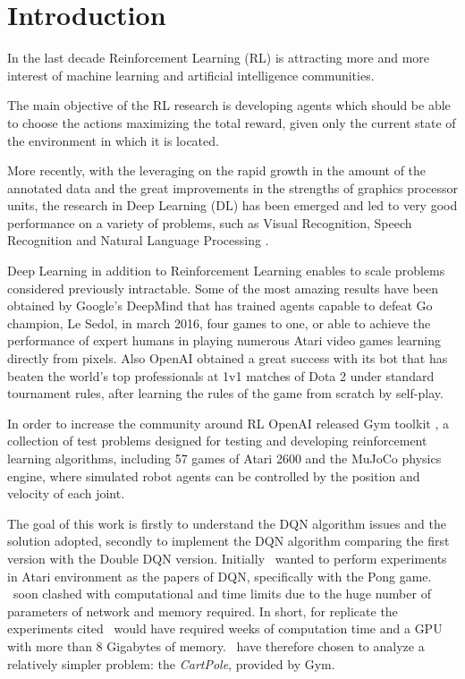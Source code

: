 \section{Introduction}

In the last decade Reinforcement Learning (RL) is attracting more and more interest of machine learning and artificial intelligence communities.

The main objective of the RL research is developing agents which should be able to choose the actions maximizing the total reward, given only the current state of the environment in which it is located.

More recently, with the leveraging on the rapid growth in the amount of the annotated data and the great improvements in the strengths of graphics processor units, the research in Deep Learning (DL) has been emerged and led to very good performance on a variety of problems, such as Visual Recognition, Speech Recognition and Natural Language Processing \cite{AdvancesCNN}.

Deep Learning in addition to Reinforcement Learning enables to scale problems considered previously intractable. Some of the most amazing results have been obtained by Google’s DeepMind that has trained agents capable to defeat Go champion, Le Sedol, in march 2016, four games to one, or able to achieve the performance of expert humans in playing numerous Atari video games learning directly from pixels. Also OpenAI obtained a great success with its bot that has beaten the world's top professionals at 1v1 matches of Dota 2 under standard tournament rules, after learning the rules of the game from scratch by self-play.

In order to increase the community around RL OpenAI released Gym toolkit \cite{Gym}, a collection of test problems designed for testing and developing reinforcement learning algorithms, including 57 games of Atari 2600 and the MuJoCo physics engine, where simulated robot agents can be controlled by the position and velocity of each joint. 

The goal of this work is firstly to understand the DQN algorithm issues and the solution adopted, secondly to implement the DQN algorithm comparing the first version with the Double DQN version. Initially \auth~wanted to perform experiments in Atari environment as the papers of DQN, specifically with the Pong game. \Auth~soon clashed with computational and time limits due to the huge number of parameters of network and memory required. In short, for replicate the experiments cited \auth~would have required weeks of computation time and a GPU with more than 8 Gigabytes of memory. \Auth~have therefore chosen to analyze a relatively simpler problem: the \textit{CartPole}, provided by Gym.\\

